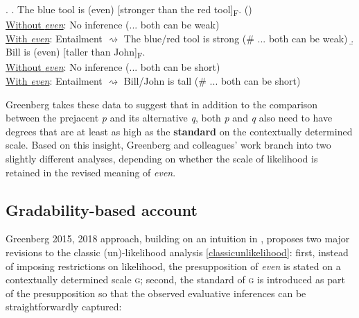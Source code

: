 \documentclass[12pt,letterpaper]{scrartcl}
\newcommand{\alignright}{\hspace*{\fill}}
\newcommand{\infer}{$\rightsquigarrow$ }
\newcommand{\sub}[1]{\textsubscript{#1}}
\begin{document}
\ex. \a. The blue tool is (even) [stronger than the red tool]\sub{F}. \alignright (\cite{greenberg_even_2015}) \\
\underline{Without \textit{even}}: No inference (... both can be weak) \\
\underline{With \textit{even}}: Entailment \infer The blue/red tool is strong (\# ... both can be weak)
\b. Bill is (even) [taller than John]\sub{F}. \\
\underline{Without \textit{even}}: No inference (... both can be short) \\
\underline{With \textit{even}}: Entailment \infer Bill/John is tall (\# ... both can be short)



Greenberg takes these data to suggest that in addition to the comparison between the prejacent \textit{p} and its alternative \textit{q}, both \textit{p} and \textit{q} also need to have degrees that are at least as high as the \textbf{standard} on the contextually determined scale. Based on this insight, Greenberg and colleagues' work branch into two slightly different analyses, depending on whether the scale of likelihood is retained in the revised meaning of \textit{even}.


\subsection{Gradability-based account}

Greenberg 2015, 2018 approach, building on an intuition in \cite{rullmann_what_2007}, proposes two major revisions to the classic (un)-likelihood analysis \ref{classicunlikelihood}: first, instead of imposing restrictions on likelihood, the presupposition of \textit{even} is stated on a contextually determined scale \textsc{g}; second, the standard of \textsc{g} is introduced as part of the presupposition so that the observed evaluative inferences can be straightforwardly captured:
\end{document}
